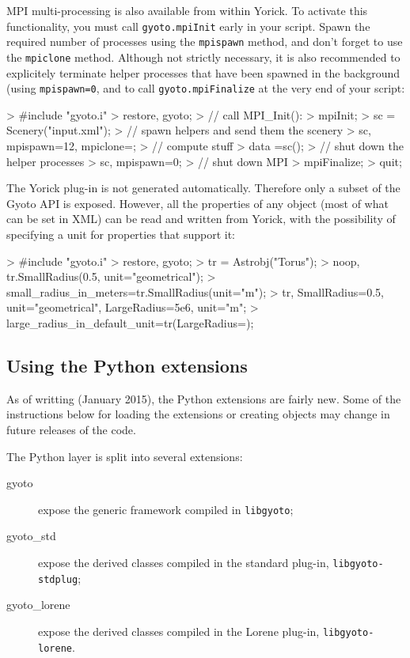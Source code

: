 \documentclass[a4paper,12pt]{article}
\begin{document}
MPI multi-processing is also available from within Yorick. To activate
this functionality, you must call \texttt{gyoto.mpiInit} early in your
script. Spawn the required number of processes using the
\texttt{mpispawn} method, and don't forget to use the
\texttt{mpiclone} method. Although not strictly necessary, it is also
recommended to explicitely terminate helper processes that have been
spawned in the background (using \texttt{mpispawn=0}, and to call
\texttt{gyoto.mpiFinalize} at the very end of your script:
\begin{code}
 > #include "gyoto.i"
 > restore, gyoto;
 > // call MPI_Init():
 > mpiInit;
 > sc = Scenery("input.xml");
 > // spawn helpers and send them the scenery
 > sc, mpispawn=12, mpiclone=;
 > // compute stuff
 > data =sc();
 > // shut down the helper processes
 > sc, mpispawn=0;
 > // shut down MPI
 > mpiFinalize;
 > quit;
\end{code}

The Yorick plug-in is not generated automatically. Therefore only a
subset of the Gyoto API is exposed. However, all the properties of any
object (most of what can be set in XML) can be read and written from
Yorick, with the possibility of specifying a unit for properties that
support it:
\begin{code}
 > #include "gyoto.i"
 > restore, gyoto;
 > tr = Astrobj("Torus");
 > noop, tr.SmallRadius(0.5, unit="geometrical");
 > small_radius_in_meters=tr.SmallRadius(unit="m");
 > tr, SmallRadius=0.5, unit="geometrical", LargeRadius=5e6, unit="m";
 > large_radius_in_default_unit=tr(LargeRadius=);
\end{code}


\subsection{Using the Python extensions}
\label{sect:python}

As of writting (January 2015), the Python extensions are fairly
new. Some of the instructions below for loading the extensions or
creating objects may change in future releases of the code.

The Python layer is split into several extensions:
\begin{description}
\item[gyoto] expose the generic framework compiled in
  \texttt{libgyoto};
\item[gyoto\_std] expose the derived classes compiled in the
  standard plug-in, \texttt{libgyoto-stdplug};
\item[gyoto\_lorene] expose the derived classes compiled in
  the Lorene plug-in, \texttt{libgyoto-lorene}.
\end{description}
\end{document}
